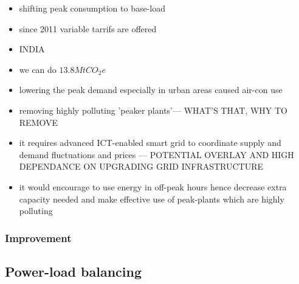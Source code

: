 \documentclass[11pt, twocolumn]{article}
\begin{document}
\begin{itemize}
\item shifting peak consumption to base-load
\item since 2011 variable tarrifs are offered


\item INDIA
\item we can do $13.8 Mt CO_2e$
\item lowering the peak demand especially in urban areas caused air-con use
\item removing highly polluting 'peaker plants'--- WHAT'S THAT, WHY TO REMOVE
\item it requires advanced ICT-enabled smart grid to coordinate supply and demand fluctuations and prices --- POTENTIAL OVERLAY AND HIGH DEPENDANCE ON UPGRADING GRID INFRASTRUCTURE
\item it would encourage to use energy in off-peak hours hence decrease extra capacity needed and make effective use of peak-plants which are highly polluting


\end{itemize}
\subsubsection{Improvement}

\subsection{Power-load balancing}
\end{document}

